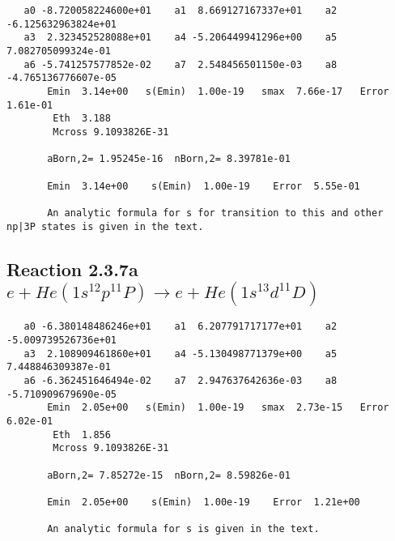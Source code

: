 \documentclass[12pt,dvipdfm]{article}
\begin{document}
\begin{small}\begin{verbatim}
   a0 -8.720058224600e+01    a1  8.669127167337e+01    a2 -6.125632963824e+01
   a3  2.323452528088e+01    a4 -5.206449941296e+00    a5  7.082705099324e-01
   a6 -5.741257577852e-02    a7  2.548456501150e-03    a8 -4.765136776607e-05
       Emin  3.14e+00   s(Emin)  1.00e-19   smax  7.66e-17   Error  1.61e-01
        Eth  3.188
        Mcross 9.1093826E-31

       aBorn,2= 1.95245e-16  nBorn,2= 8.39781e-01

       Emin  3.14e+00    s(Emin)  1.00e-19    Error  5.55e-01

       An analytic formula for s for transition to this and other np|3P states is given in the text.
\end{verbatim}\end{small}









\newpage
\subsection{
Reaction 2.3.7a $e + He(1s^12p^11P) \rightarrow e + He(1s^13d^11D)$}

















\begin{small}\begin{verbatim}
   a0 -6.380148486246e+01    a1  6.207791717177e+01    a2 -5.009739526736e+01
   a3  2.108909461860e+01    a4 -5.130498771379e+00    a5  7.448846309387e-01
   a6 -6.362451646494e-02    a7  2.947637642636e-03    a8 -5.710909679690e-05
       Emin  2.05e+00   s(Emin)  1.00e-19   smax  2.73e-15   Error  6.02e-01
        Eth  1.856
        Mcross 9.1093826E-31

       aBorn,2= 7.85272e-15  nBorn,2= 8.59826e-01

       Emin  2.05e+00    s(Emin)  1.00e-19    Error  1.21e+00

       An analytic formula for s is given in the text.
\end{verbatim}\end{small}
\end{document}

